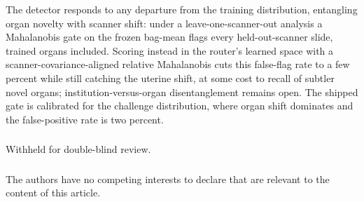 \documentclass[runningheads]{llncs}
\begin{document}
The detector responds to any departure from the training distribution, entangling organ novelty with scanner
shift: under a leave-one-scanner-out analysis a Mahalanobis gate on the frozen bag-mean flags every held-out-scanner
slide, trained organs included. Scoring instead in the router's learned space with a scanner-covariance-aligned
relative Mahalanobis cuts this false-flag rate to a few percent while still catching the uterine shift, at some
cost to recall of subtler novel organs; institution-versus-organ disentanglement remains open. The shipped gate
is calibrated for the challenge distribution, where organ shift dominates and the false-positive rate is two
percent.

\begin{credits}
\subsubsection{\ackname} Withheld for double-blind review.

\subsubsection{\discintname} The authors have no competing interests to declare that are relevant to the
content of this article.
\end{credits}



\end{document}
